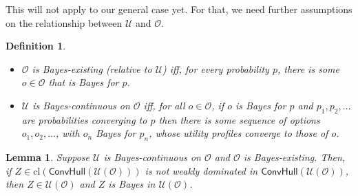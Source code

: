\documentclass[a4paper]{article}
\newtheorem{definition}{Definition}
\newtheorem{lemma}[theorem]{Lemma}
\newtheorem{corollary}[theorem]{Corollary}
\newcommand\cl{\mathrm{cl}}
\renewcommand\O{\mathcal{O}}
\newcommand\Uwald{\mathcal{U}} %
\newcommand{\Conv}{\mathsf{ConvHull}}
\newenvironment{CCM rewritten}
{\begingroup\color{blue}} %
{\endgroup}              %
\begin{document}
	
	
	
	This will not apply to our general case yet. For that, we need further assumptions on the relationship between $\Uwald$ and $\O$. 


\begin{definition}\ 
	\begin{itemize}
		\item $\O$ is \emph{Bayes-existing} (relative to $\Uwald$) iff, for every probability $p$, there is some $o\in\O$ that is Bayes for $p$.
		\item $\Uwald$ is \emph{Bayes-continuous} on $\O$ iff, for all $o\in\O$, if $o$ is Bayes for $p$ and $p_1,p_2,\ldots$ are probabilities converging to $p$ then there is some sequence of options $o_1,o_2,\ldots$, with $o_n$ Bayes for $p_n$, whose utility profiles converge to those of $o$. 
	\end{itemize}
\end{definition}
	
	\begin{lemma}\label{thm:cct:bdry are the Bayes optimal}
		Suppose $\Uwald$ is Bayes-continuous on $\O$ and $\O$ is Bayes-existing. Then, if $Z\in\cl(\Conv(\Uwald(\O)))$ is not weakly dominated in $\Conv(\Uwald(\O))$, then $Z\in \Uwald(\O)$ and $Z$ is Bayes  in $\Uwald(\O)$. 
%		
	\end{lemma}
	
\end{document}
